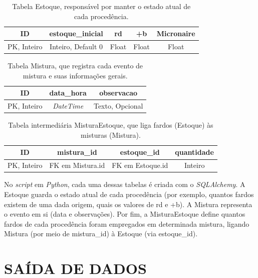 \documentclass[
    12pt,                %
    openright,           %
    oneside,             %
    a4paper,             %
    english,             %
    spanish,             %
    brazil               %
]{ufscar}
\begin{document}
\begin{table}[htp]
    \centering
    \caption{Tabela Estoque, responsável por manter o estado atual de cada procedência.}
    \begin{tabular}{c c c c c}
         ID & estoque\_inicial & rd & +b & Micronaire \\ \hline
         PK, Inteiro & Inteiro, Default 0 & Float & Float & Float \\
    \end{tabular}
    \label{tab:tb_estoque}
\end{table}

\begin{table}[htp]
    \centering
    \caption{Tabela Mistura, que registra cada evento de mistura e suas informações gerais.}
    \begin{tabular}{c c c}
         ID & data\_hora & observacao \\ \hline
         PK, Inteiro & \textit{DateTime} & Texto, Opcional \\
    \end{tabular}
    \label{tab:tb_mistura}
\end{table}

\begin{table}[htp]
    \centering
    \caption{Tabela intermediária MisturaEstoque, que liga fardos (Estoque) às misturas (Mistura).}
    \begin{tabular}{c c c c}
         ID & mistura\_id & estoque\_id & quantidade \\ \hline
         PK, Inteiro & FK em Mistura.id & FK em Estoque.id & Inteiro \\
    \end{tabular}
    \label{tab:tb_mistura_estoque}
\end{table}

No \textit{script} em \textit{Python}, cada uma dessas tabelas é criada com o \textit{SQLAlchemy}. A Estoque guarda o estado atual de cada procedência (por exemplo, quantos fardos existem de uma dada origem, quais os valores de rd e +b). A Mistura representa o evento em si (data e observações). Por fim, a MisturaEstoque define quantos fardos de cada procedência foram empregados em determinada mistura, ligando Mistura (por meio de mistura\_id) à Estoque (via estoque\_id).

\section{SAÍDA DE DADOS}
\end{document}

